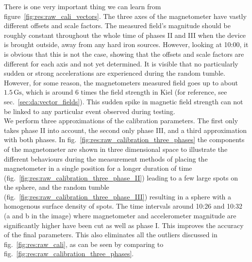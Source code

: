 There is one very important thing we can learn from figure~\ref{fig:res:raw_cali_vectors}. The three axes of the magnetometer have vastly different offsets and scale factors. The measured field's magnitude should be roughly constant throughout the whole time of phases II and III when the device is brought outside, away from any hard iron sources. However, looking at 10:00, it is obvious that this is not the case, showing that the offsets and scale factors are different for each axis and not yet determined. It is visible that no particularly sudden or strong accelerations are experienced during the random tumble. However, for some reason, the magnetometers measured field goes up to about $1.5\,\mathrm{Gs}$, which is around 6 times the field strength in Kiel (for reference, see sec.~\ref{sec:da:vector_fields}). This sudden spike in magnetic field strength can not be linked to any particular event observed during testing. \\
We perform three approximations of the calibration parameters. The first only takes phase II into account, the second only phase III, and a third approximation with both phases. In fig.~\ref{fig:res:raw_calibration_three_phases} the components of the magnetometer are shown in three dimensional space to illustrate the different behaviours during the measurement methods of placing the magnetometer in a single position for a longer duration of time (fig.~\ref{fig:res:raw_calibration_three_phase_II}) leading to a few large spots on the sphere, and the random tumble (fig.~\ref{fig:res:raw_calibration_three_phase_III}) resulting in a sphere with a homogenous surface density of spots. The time intervals around 10:26 and 10:32 (a and b in the image) where magnetometer and accelerometer magnitude are significantly higher have been cut as well as phase I. This improves the accuracy of the final parameters. This also eliminates all the outliers discussed in fig.~\ref{fig:res:raw_cali}, as can be seen by comparing to fig.~\ref{fig:res:raw_calibration_three_phases}.

